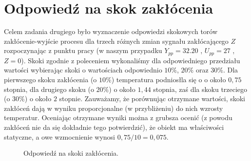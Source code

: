 \chapter{Odpowiedź na skok zakłócenia}
Celem zadania drugiego było wyznaczenie odpowiedzi skokowych torów zakłócenie-wyjście
procesu dla trzech różnych zmian sygnału zakłócającego $Z$ rozpoczynając z punktu pracy
(w naszym przypadku $Y_{pp} = 32.20$ , $U_{pp} = 27$ , $Z = 0$). Skoki zgodnie z
poleceniem wykonaliśmy dla odpowiedniego przedziału wartości wybierając skoki o
wartościach odpowiednio $10\%$, $20\%$ oraz $30\%$. Dla pierwszego skoku
zakłócenia (o $10\%$) temperatura podniosłla się o o około $0,75$ stopnia,
dla drugiego skoku (o $20\%$) o około $1,44$ stopnia, zaś dla skoku trzeciego
(o $30\%$) o około $2$ stopnie. Zauważamy, że porównując otrzymane
wartości, skoki zakłóceń dają  w wyniku proporcjonalne (w przybliżeniu)
do nich wzrosty temperatur. Oceniając otrzymane wyniki można z grubsza ocenić
(z powodu zakłóceń nie da się dokładnie tego potwierdzić), że obiekt ma
właściwości statyczne, a owe wzmocnienie wynosi $0,75/10 = 0,075$.

\begin{figure}[tb]
\centering
{}
\caption{Odpowiedź na skoki zakłócenia.}
\label{fig:skok_zak}
\end{figure}
